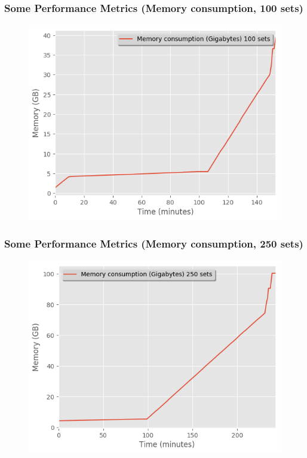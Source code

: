 \documentclass[9pt,sansserif]{beamer}
\begin{document}
\begin{frame}{}\small
\frametitle{Some Performance Metrics (Memory consumption, 100 sets) }

\begin{figure}[hb!]
\centering\leavevmode
\graphicspath{{./png/Benchmarks/}}
%
\hspace{-4cm}
\begin{minipage}{10cm}
\centering\leavevmode
\includegraphics[scale=0.55]{Fig_100.png}
\end{minipage}
\end{figure}
\end{frame}



\begin{frame}{}\small
\frametitle{Some Performance Metrics (Memory consumption, 250 sets) }

\begin{figure}[hb!]
\centering\leavevmode
\graphicspath{{./png/Benchmarks/}}
%
\hspace{-4cm}
\begin{minipage}{10cm}
\centering\leavevmode
\includegraphics[scale=0.55]{Fig_250.png}
\end{minipage}
\end{figure}
\end{frame}
\end{document}
